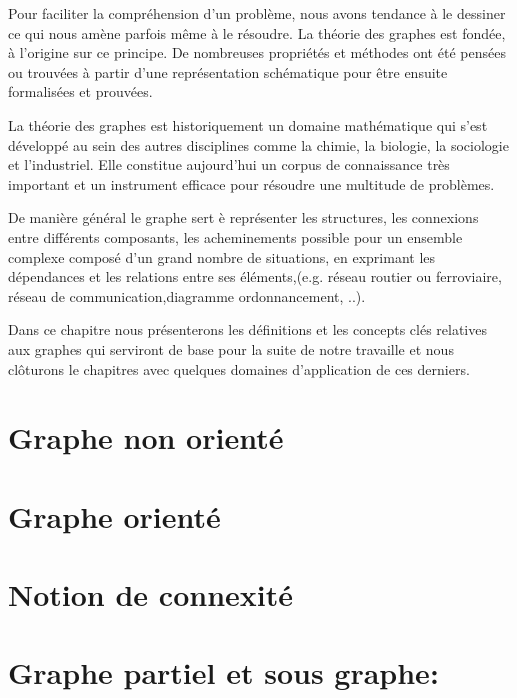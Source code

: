 Pour faciliter la compréhension d’un problème, nous avons tendance à le dessiner ce qui nous amène parfois même à le résoudre. La théorie des graphes est fondée, à l'origine sur ce principe. De nombreuses propriétés et méthodes ont été pensées ou trouvées à partir d'une représentation schématique pour être ensuite formalisées et prouvées.

La théorie des graphes est historiquement un domaine mathématique qui s'est développé au sein des autres disciplines comme la chimie, la biologie, la sociologie et l'industriel. Elle constitue aujourd'hui un corpus de connaissance très important et un instrument efficace pour résoudre une multitude de problèmes.

De manière général le graphe sert è représenter les structures, les connexions entre différents composants, les acheminements possible pour un ensemble complexe composé d'un grand nombre de situations, en exprimant les dépendances et les relations entre ses éléments,(e.g. réseau routier ou ferroviaire, réseau de communication,diagramme ordonnancement, ..).

Dans ce chapitre nous présenterons les définitions et les concepts clés relatives aux graphes qui serviront de base pour la suite de notre travaille et nous clôturons le chapitres avec quelques domaines d'application de ces derniers.
	
	
	\section{Graphe non orienté}
		
			
	\section{Graphe orienté}	
		
	
	\section{Notion de connexité}
			
	
	\section{Graphe partiel et sous graphe:}
    			
    		
